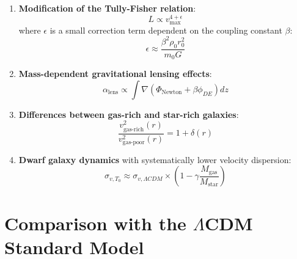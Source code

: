 \documentclass[a4paper,12pt]{article}
\theoremstyle{definition}
\theoremstyle{remark}
\begin{document}
	\begin{enumerate}
		\item \textbf{Modification of the Tully-Fisher relation}:
		\begin{equation}
			L \propto v_{\text{max}}^{4+\epsilon}
		\end{equation}
		where $\epsilon$ is a small correction term dependent on the coupling constant $\beta$:
		\begin{equation}
			\epsilon \approx \frac{\beta^2 \rho_0 r_0^2}{m_0 G}
		\end{equation}
		
		\item \textbf{Mass-dependent gravitational lensing effects}:
		\begin{equation}
			\alpha_{\text{lens}} \propto \int \nabla(\Phi_{\text{Newton}} + \beta\phi_{DE}) dz
		\end{equation}
		
		\item \textbf{Differences between gas-rich and star-rich galaxies}:
		\begin{equation}
			\frac{v^2_{\text{gas-rich}}(r)}{v^2_{\text{gas-poor}}(r)} = 1 + \delta(r)
		\end{equation}
		
		\item \textbf{Dwarf galaxy dynamics} with systematically lower velocity dispersion:
		\begin{equation}
			\sigma_{v,T_0} \approx \sigma_{v,\Lambda CDM} \times \left(1 - \gamma \frac{M_{\text{gas}}}{M_{\text{star}}}\right)
		\end{equation}
	\end{enumerate}
	
	\section{Comparison with the $\Lambda$CDM Standard Model}
	
\end{document}
